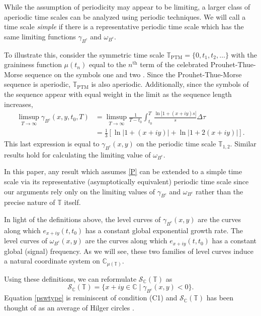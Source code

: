 \documentclass[reqno]{amsart}
\begin{document}
\begin{remark} \rm
While the assumption of periodicity may appear to be limiting, a larger class of
aperiodic time scales can be analyzed using periodic techniques.
We will call a time scale \emph{simple} if there is a representative periodic time
scale which has the same limiting functions $\gamma_{B^c}$ and $\omega_{B^c}$.

To illustrate this, consider the symmetric time scale
$\mathbb{T}_{\text{PTM}} =\{0,t_1,t_2,\ldots\}$ with the graininess function $\mu(t_n)$
 equal to the $n^{\text{th}}$ term of the celebrated Prouhet-Thue-Morse sequence on
the symbols one and two \cite{allouche1999ubiquitous}.
Since the Prouhet-Thue-Morse sequence is aperiodic, $\mathbb{T}_{\text{PTM}}$ is also aperiodic.
Additionally, since the symbols of the sequence appear with equal weight in the limit
as the sequence length increases,
\begin{align*}
 \limsup_{T \to \infty} \gamma_{B^c}(x,y,t_0,T)
&= \limsup_{T \to \infty} \frac{1}{T-t_0} \int_{t_0}^{T} \frac{\ln|1+(x+iy) s|}{s} \Delta \tau\\
&= \frac{1}{3} \left[ \ln|1+(x+iy)| + \ln|1+2(x+iy)| \right].
\end{align*}
This last expression is equal to $\gamma_{B^c}(x,y)$ on the periodic time scale
$\mathbb{T}_{1,2}$. Similar results hold for calculating the limiting value of $\omega_{B^c}$.

In this paper, any result which assumes \eqref{P} can be extended to a simple time
scale via its representative (asymptotically equivalent) periodic time scale since our
arguments rely only on the limiting values of $\gamma_{B^c}$ and $\omega_{B^c}$
rather than the precise nature of $\mathbb{T}$ itself.
\end{remark}

In light of the definitions above, the level curves of $\gamma_{B^c}(x,y)$ are the
curves along which $e_{x+iy}(t,t_0)$ has a constant global exponential growth rate.
The level curves of $\omega_{B^c}(x,y)$ are the curves along which $e_{x+iy}(t,t_0)$
has a constant global (signal) frequency. As we will see, these two families of level
curves induce a natural coordinate system on $\mathbb{C}_{\mu(\mathbb{T})}$.

Using these definitions, we can reformulate $\mathcal{S}_{\mathbb{C}}(\mathbb{T})$ as
\begin{equation}\label{pswtype}
 \mathcal{S}_{\mathbb{C}}(\mathbb{T}) = \{x+iy \in \mathbb{C} \mid \gamma_{B^c}(x,y) <0\}.
\end{equation}
Equation \eqref{pswtype} is reminiscent of condition (C1) and $\mathcal{S}_\mathbb{C}(\mathbb{T})$
has been thought of as an average of Hilger circles \cite{DaGrMaJa}.
\end{document}
